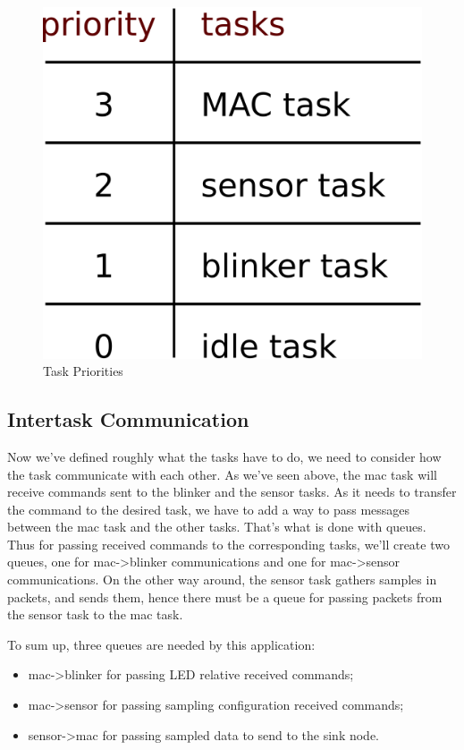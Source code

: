 \documentclass[11pt]{report}
\begin{document}
\begin{figure}[ht]
	\begin{center}
	\includegraphics[scale=1]{figures/prio.png}
	\end{center}
	\caption{Task Priorities}
	\label{fig:prio}
\end{figure}

\subsection{Intertask Communication}
Now we've defined roughly what the tasks have to do, we need to consider how the task communicate with each other. As we've seen above, the mac task will receive commands sent to the blinker and the sensor tasks. As it needs to transfer the command to the desired task, we have to add a way to pass messages between the mac task and the other tasks. That's what is done with queues.
Thus for passing received commands to the corresponding tasks, we'll create two queues, one for mac->blinker communications and one for mac->sensor communications. On the other way around, the sensor task gathers samples in packets, and sends them, hence there must be a queue for passing packets from the sensor task to the mac task.

To sum up, three queues are needed by this application:
\begin{itemize}
	\item mac-\textgreater blinker for passing LED relative received commands;
	\item mac-\textgreater sensor for passing sampling configuration received commands;
	\item sensor-\textgreater mac for passing sampled data to send to the sink node.
\end{itemize}
\end{document}
